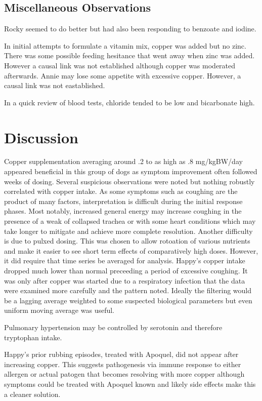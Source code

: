 \documentclass[aps,secnumarabic,balancelastpage,amsmath,amssymb,nofootinbib]{revtex4}
\begin{document}
\subsection{Miscellaneous Observations}
Rocky seemed to do better but had  also been responding
to benzoate and iodine. 

In initial attempts to formulate a vitamin mix,
copper was added but no zinc. There was some possible
feeding hesitance that went away when zinc was added.
However a causal link was not established although 
copper was moderated afterwards. Annie may lose
some appetite with excessive copper. However, a
causal link was not eastablished. 

In a quick review of blood tests, 
chloride tended to be low and bicarbonate high.


\section{Discussion }


Copper supplementation averaging around .2 to as high 
as .8 mg/kgBW/day appeared beneficial in this group of
dogs as symptom improvement often followed weeks of dosing.
Several suspicious observations were noted but nothing
robustly correlated with copper intake. 
As some symptoms such as coughing are the product
of many factors, interpretation is difficult during the 
initial response phases. Most notably, increased general
energy may increase coughing in the presence of a weak
of collapsed trachea or with some heart conditions which
may take longer to mitigate and achieve  more complete  
resolution. Another difficulty is  due to pulxed dosing.
This was chosen to allow rotoation of various
nutrients and make it easier to see short term effects
of comparatively high doses. However, it did require 
that time series be averaged  for analysis.
Happy's copper intake dropped much lower than normal
preceeding a period of excessive coughing. It was only
after copper was started due to a respiratory infection
that the data were examined more carefully and the pattern
noted. Ideally the filtering would be a lagging average
weighted to some suspected biological parameters but
even uniform moving average was useful.   

Pulmonary hypertension may be controlled by serotonin
\cite{PMID27927914} and therefore tryptophan intake. 

Happy's prior rubbing episodes, treated with Apoquel, did not appear
after increasing copper. This suggests pathogenesis via 
immune response to either allergen or actual patogen 
that becomes resolving with more copper although symptoms
could be treated with Apoquel known and likely side effects
make this a cleaner solution. 
\end{document}
